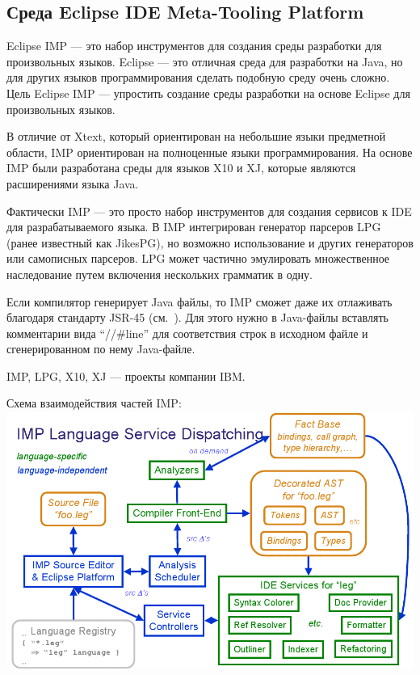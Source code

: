 \documentclass[a4paper,12pt,titlepage]{extarticle}
\begin{document}
\subsection{Среда Eclipse IDE Meta-Tooling Platform}
\label{imp}
Eclipse IMP --- это набор инструментов для создания среды разработки для
произвольных языков.
Eclipse --- это отличная среда для разработки на Java, но для
других языков программирования сделать подобную среду очень сложно. Цель
Eclipse IMP --- упростить создание среды разработки на основе Eclipse для
произвольных языков.

В отличие от Xtext, который ориентирован на небольшие языки предметной области,
IMP ориентирован на полноценные языки программирования. На основе IMP
были разработана среды для языков X10 и XJ, которые являются расширениями
языка Java.

Фактически IMP --- это просто набор инструментов для создания сервисов к IDE для
разрабатываемого языка. В IMP интегрирован генератор парсеров LPG (ранее
известный как JikesPG), но возможно использование и других генераторов или
самописных парсеров. LPG может частично эмулировать множественное наследование
путем включения нескольких грамматик в одну.

Если компилятор генерирует Java файлы, то IMP сможет даже их отлаживать
благодаря стандарту JSR-45 (см.~\cite{JSR45}). Для этого нужно в Java-файлы
вставлять комментарии вида ``//\#line'' для соответствия строк в исходном файле и
сгенерированном по нему Java-файле.

IMP, LPG, X10, XJ --- проекты компании IBM.

\pagebreak
\begin{center}
Схема взаимодействия частей IMP:
\includegraphics[scale=0.5]{img/imp.png}
\end{center}
\end{document}

